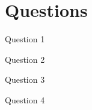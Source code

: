 \section{Questions}
\begin{namedframe}{Question 1}
	
\end{namedframe}
\begin{namedframe}{Question 2}
	
\end{namedframe}
\begin{namedframe}{Question 3}
	
\end{namedframe}
\begin{namedframe}{Question 4}
	
\end{namedframe}
